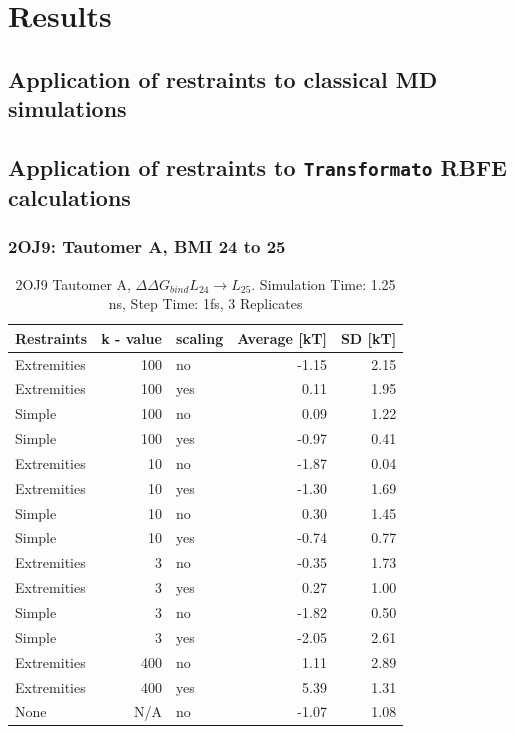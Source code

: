 \documentclass[oneside]{scrreprt}
\begin{document}
\chapter{Results}

\section{Application of restraints to classical MD simulations}

\section{Application of restraints to \texttt{Transformato} RBFE calculations}
\subsection{2OJ9: Tautomer A, BMI 24 to 25}
\begin{table}\small
\begin{center}
    \begin{tabular}{l|r|l|r|r}
        Restraints & k - value & scaling & Average [kT] & SD [kT]   \\
        \hline
        Extremities & 100 & no  & -1.15 & 2.15                                   \\
        Extremities & 100 & yes & 0.11  & 1.95                                   \\
        Simple      & 100 & no  & 0.09  & 1.22                                   \\
        Simple      & 100 & yes & -0.97 & 0.41  \\
        Extremities & 10  & no  & -1.87 & 0.04   \\
        Extremities & 10  & yes & -1.30 & 1.69                                   \\
        Simple      & 10  & no  & 0.30  & 1.45                                   \\
        Simple      & 10  & yes & -0.74 & 0.77   \\
        Extremities & 3   & no  & -0.35 & 1.73                                   \\
        Extremities & 3   & yes & 0.27  & 1.00                                   \\
        Simple      & 3   & no  & -1.82 & 0.50   \\
        Simple      & 3   & yes & -2.05 & 2.61                                   \\
        Extremities & 400 & no  & 1.11  & 2.89                                   \\
        Extremities & 400 & yes & 5.39  & 1.31                                   \\
        None        & N/A & no  & -1.07 & 1.08                                  
    \end{tabular}
\end{center}
\caption{2OJ9 Tautomer A, $\Delta\Delta G_{bind}L_{24}\xrightarrow{} L_{25}$. Simulation Time: 1.25 ns, Step Time: 1fs, 3 Replicates}
\label{tab:2oj9_taapdb_24to25_shortruns}
\end{table}
\end{document}
